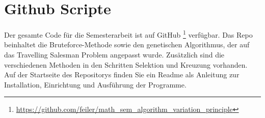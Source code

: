 %
%
%
%
\section{Github Scripte
\label{buch:paper:varalg:section:github_scripte}}

Der gesamte Code für die Semesterarbeit ist auf GitHub 
\footnote{\url{https://github.com/feiler/math_sem_algorithm_variation_principle}}
\cite{algorythm:repo} verfügbar. Das Repo beinhaltet die Bruteforce-Methode sowie
den genetischen Algorithmus, der auf das Travelling Salesman Problem angepasst wurde. Zusätzlich
sind die verschiedenen Methoden in den Schritten Selektion und Kreuzung vorhanden.
Auf der Startseite des Repositorys finden Sie ein Readme als Anleitung zur 
Installation, Einrichtung und Ausführung der Programme.